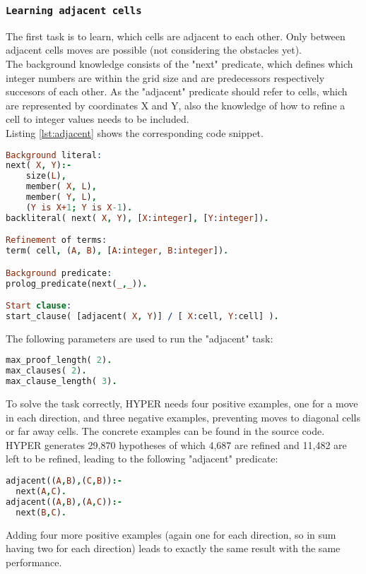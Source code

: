 \subsubsection{\texttt{Learning adjacent cells}}
The first task is to learn, which cells are adjacent to each other. Only between adjacent cells moves are possible (not considering the obstacles yet).\\
The background knowledge consists of the "next" predicate, which defines which integer numbers are within the grid size and are predecessors respectively succesors of each other.
As the "adjacent" predicate should refer to cells, which are represented by coordinates X and Y, also the knowledge of how to refine a cell to integer values needs to be included.\\
Listing \ref{lst:adjacent} shows the corresponding code snippet.
\begin{lstlisting}[label={lst:adjacent}, language=Prolog, caption=Learning the predicate "adjacent", belowcaptionskip=1cm]
Background literal:
next( X, Y):- 
	size(L),
	member( X, L),
	member( Y, L),
	(Y is X+1; Y is X-1).
backliteral( next( X, Y), [X:integer], [Y:integer]).

Refinement of terms:
term( cell, (A, B), [A:integer, B:integer]).

Background predicate:
prolog_predicate(next(_,_)).

Start clause:
start_clause( [adjacent( X, Y)] / [ X:cell, Y:cell] ). 
\end{lstlisting}
The following parameters are used to run the "adjacent" task:
\begin{lstlisting}[label={lst:adjacent_params}, language=Prolog, caption=Parameters for learning "adjacent", belowcaptionskip=1cm]
max_proof_length( 2).   
max_clauses( 2).        
max_clause_length( 3).  
\end{lstlisting}
To solve the task correctly, HYPER needs four positive examples, one for a move in each direction, and three negative examples, preventing moves to diagonal cells or far away cells.
The concrete examples can be found in the source code. HYPER generates 29,870 hypotheses of which 4,687 are refined and 11,482 are left to be refined, leading to the following "adjacent" predicate:
\begin{lstlisting}[label={lst:adjacent_res}, language=Prolog, caption=Predicate "adjacent", belowcaptionskip=1cm]
adjacent((A,B),(C,B)):-
  next(A,C).
adjacent((A,B),(A,C)):-
  next(B,C).
\end{lstlisting}
Adding four more positive examples (again one for each direction, so in sum having two for each direction) leads to exactly the same result with the same performance.\\
